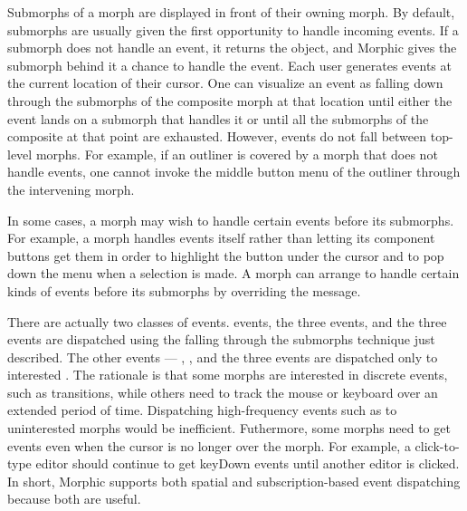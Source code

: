 \documentclass[letterpaper,10pt,english]{sphinxmanual}
\begin{document}
Submorphs of a morph are displayed in front of their owning morph. By default, submorphs are usually given the first opportunity to handle incoming events. If a submorph does not handle an event, it returns the  object, and Morphic gives the submorph behind it a chance to handle the event. Each user generates events at the current location of their cursor. One can visualize an event as \sphinxquotedblleft{}falling down through\sphinxquotedblright{} the submorphs of the composite morph at that location until either the event lands on a submorph that handles it or until all the submorphs of the composite at that point are exhausted. However, events do not fall between top-level morphs. For example, if an outliner is covered by a morph that does not handle  events, one cannot invoke the middle button menu of the outliner through the intervening morph.

In some cases, a morph may wish to handle certain events before its submorphs. For example, a  morph handles  events itself rather than letting its component buttons get them in order to highlight the button under the cursor and to pop down the menu when a selection is made. A morph can arrange to handle certain kinds of events before its submorphs by overriding the  message.

There are actually two classes of events.  events, the three  events, and the three  events are dispatched using the \sphinxquotedblleft{}falling through the submorphs\sphinxquotedblright{} technique just described. The other events — , , and the three  events are dispatched only to interested . The rationale is that some morphs are interested in discrete events, such as  transitions, while others need to track the mouse or keyboard over an extended period of time. Dispatching high-frequency events such as  to uninterested morphs would be inefficient. Futhermore, some morphs need to get events even when the cursor is no longer over the morph. For example, a click-to-type editor should continue to get keyDown events until another editor is clicked. In short, Morphic supports both spatial and subscription-based event dispatching because both are useful.
\end{document}
